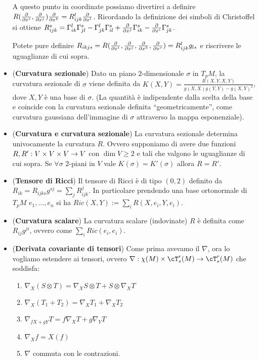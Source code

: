 \documentclass[a4paper,NoNotes,GeneralMath]{stdmdoc}
\begin{document}
\begin{itemize}
  A questo punto in coordinate possiamo divertirci a definire $R(\dpar{}{x^i}, \dpar{}{x^j}) \dpar{}{x^k} = R_{ijk}^l \dpar{}{x^l}$. Ricordando la definizione dei simboli di Christoffel si ottiene $R_{ijk}^s = \Gamma_{ik}^l \Gamma_{jl}^s - \Gamma_{jk}^l \Gamma_{il}^s + \dpar{}{x^j} \Gamma_{ik}^s - \dpar{}{x^i} \Gamma_{jk}^s$.

  Potete pure definire $R_{ikjs} = R(\dpar{}{x^i}, \dpar{}{x^j}, \dpar{}{x^k}, \dpar{}{x^s}) = R_{ijk}^l g_{ls}$ e riscrivere le uguaglianze di cui sopra.
\item ({\bf Curvatura sezionale}) Dato un piano $2$-dimensionale $\sigma$ in $T_pM$, la curvatura sezionale di $\sigma$ viene definita da $K(X, Y) = \frac{R(X, Y, X, Y)}{g(X, X) g(Y, Y) - g(X, Y)^2}$, dove $X, Y$ è una base di $\sigma$. (La quantità è indipendente dalla scelta della base e coincide con la curvatura sezionale definita ``geometricamente'', come curvatura gaussiana dell'immagine di $\sigma$ attraverso la mappa esponenziale).
\item ({\bf Curvatura e curvatura sezionale}) La curvatura sezionale determina univocamente la curvatura $R$. Ovvero supponiamo di avere due funzioni $R, R': V \times V \times V \rightarrow V$ con $\dim V \ge 2$ e tali che valgono le uguaglianze di cui sopra. Se $\forall \sigma$ $2$-piani in $V$ vale $K(\sigma) = K'(\sigma)$ allora $R = R'$.
\item ({\bf Tensore di Ricci}) Il tensore di Ricci è di tipo $(0, 2)$ definito da $R_{ik} = R_{ijks} g^{sj} = \sum_j R_{ijk}^j$. In particolare prendendo una base ortonormale di $T_pM$ $e_1, \ldots, e_n$ si ha $Ric(X, Y) := \sum_i R(X, e_i, Y, e_i)$.
\item ({\bf Curvatura scalare}) La curvatura scalare (indovinate) $R$ è definita come $R_{ij}g^{ji}$, ovvero come $\sum_i Ric(e_i, e_i)$.
\item ({\bf Derivata covariante di tensori}) Come prima avevamo il $\nabla$, ora lo vogliamo estendere ai tensori, ovvero $\nabla: \chi(M) \times \cT^r_s (M) \rar \cT^r_s (M)$ che soddisfa:
  \begin{enumerate}
  \item $\nabla_X (S \otimes T) = \nabla_X S \otimes T + S \otimes \nabla_X T$
  \item $\nabla_X (T_1 + T_2) = \nabla_X T_1 + \nabla_X T_2$
  \item $\nabla_{fX + gY} T = f \nabla_X T + g \nabla_Y T$
  \item $\nabla_X f = X(f)$
  \item $\nabla$ commuta con le contrazioni.

\end{enumerate}
\end{itemize}
\end{document}

